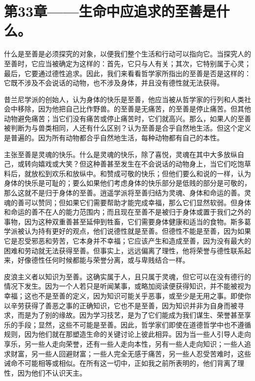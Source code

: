 
\section{第33章——生命中应追求的至善是什么。}

什么是至善是必须探究的对象，以便我们整个生活和行动可以指向它。当探究人的至善时，它应当被确定为这样的：首先，它只与人有关；其次，它特别属于心灵；最后，它要通过德性追求。因此，我们来看看哲学家所指出的至善是否是这样的：它既不涉及不会说话的动物，也不涉及身体，并且没有德性就无法获得。\par

昔兰尼学派的创始人，认为身体的快乐是至善，他应当被从哲学家的行列和人类社会中移除，因为他把自己比作野兽。的至善是无痛苦，的至善是停止痛苦。但其他动物避免痛苦；当它们没有痛苦或停止痛苦时，它们就高兴。那么，如果人的至善被判断为与兽类相同，人还有什么区别？认为至善是合乎自然地生活。但这个定义是普遍的。因为所有动物都合乎自然地生活，每种动物都有自己的本性。\par

主张至善是灵魂的快乐。什么是灵魂的快乐，除了喜悦，灵魂在其中大多放纵自己，或转向嬉戏或大笑？但这种善甚至发生在不会说话的动物身上，当它们吃饱草料后，就放松到欢乐和放纵中。和赞成可敬的快乐；但他们要么和说的一样，认为身体的快乐是可耻的；要么如果他们考虑身体的快乐部分是低贱的部分是可敬的，那么这就不是归于身体的至善。逍遥学派将至善归结为灵魂、身体和命运的善。灵魂的善可以赞同；但如果它们需要帮助才能完成幸福，那么它们显然软弱。但身体和命运的善不在人的能力范围内；而且现在至善不是被归于身体或置于我们之外的事物，因为这种双重善甚至延伸到牲畜，它们需要身体健康和适当的食物。斯多葛学派被认为持有更好的观点，他们说德性就是至善。但德性不能是至善，因为如果它是忍受邪恶和劳苦，它本身并不幸福；它应该产生和造成至善，因为没有最大的困难和劳动就无法获得至善。但事实上，远远偏离了理性，他将荣誉与德性联系起来，好像德性任何时候都能与荣誉分离，或与卑贱结合一样。\par

皮浪主义者以知识为至善。这确实属于人，且只属于灵魂，但它可以在没有德行的情况下发生。因为一个人若只是听闻某事，或略加阅读便获得知识，并不能被视为幸福；这也不是至善的定义，因为知识可能关乎恶事，或至少是无用之事。即使你以辛劳获得了善恶之事的正确知识，它也不是至善，因为知识并非为自身而被寻求，而是为了别的缘故。因为学习技艺，是为了它们能成为我们谋生、荣誉甚至享乐的手段；显然，这些不可能是至善。因此，哲学家们即使在道德哲学中也不遵循规则，因为他们就在那塑造生命的关键讨论上彼此相异。因为当一些人引导人走向享乐，另一些人走向荣誉，还有一些人走向本性，另有一些人走向知识；一些人追求财富，另一些人回避财富；一些人完全无感于痛苦，另一些人忍受苦难时，这些诫命不可能相等或相似。在所有这一切中，正如我之前所表明的，他们背离了理性，因为他们不认识天主。\par

